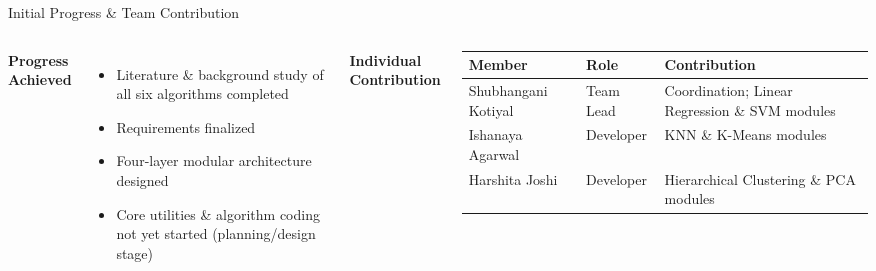 \documentclass[aspectratio=169,11pt]{beamer}
\begin{document}
\begin{frame}{Initial Progress \& Team Contribution}
\begin{columns}[T,totalwidth=\textwidth]
\textbf{\color{GEUBlue}Progress Achieved}
\begin{itemize}\itemsep3pt
\item Literature \& background study of all six algorithms completed
\item Requirements finalized
\item Four-layer modular architecture designed
\item Core utilities \& algorithm coding not yet started (planning/design stage)
\end{itemize}
\textbf{\color{GEUBlue}Individual Contribution}
\vspace{2mm}
\scriptsize
\begin{tabularx}{\textwidth}{@{}p{2.3cm}p{1.6cm}X@{}}
\toprule
Member & Role & Contribution\\
\midrule
Shubhangani Kotiyal & Team Lead & Coordination; Linear Regression \& SVM modules\\
Ishanaya Agarwal & Developer & KNN \& K-Means modules\\
Harshita Joshi & Developer & Hierarchical Clustering \& PCA modules\\
\bottomrule
\end{tabularx}
\end{columns}
\end{frame}
\end{document}
